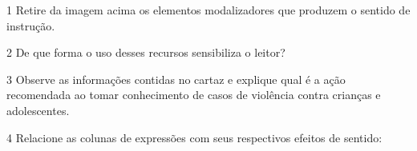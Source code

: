 {%



\num{1} Retire da imagem acima os elementos modalizadores que produzem o sentido de instrução.


\num{2} De que forma o uso desses recursos sensibiliza o leitor?


\num{3} Observe as informações contidas no cartaz e explique qual é a ação
recomendada ao tomar conhecimento de casos de violência contra crianças e adolescentes.


\num{4} Relacione as colunas de expressões com seus respectivos efeitos de sentido:



}
